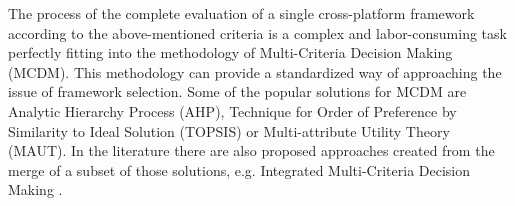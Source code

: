 The process of the complete evaluation of a single cross-platform framework according to the above-mentioned criteria is a complex and labor-consuming task perfectly fitting into the methodology of Multi-Criteria Decision Making (MCDM). This methodology can provide a standardized way of approaching the issue of framework selection. Some of the popular solutions for MCDM are Analytic Hierarchy Process (AHP), Technique for Order of Preference by Similarity to Ideal Solution (TOPSIS) or Multi-attribute Utility Theory (MAUT). In the literature there are also proposed approaches created from the merge of a subset of those solutions, e.g. Integrated Multi-Criteria Decision Making \cite{lachgar_mcdm_cp}.
